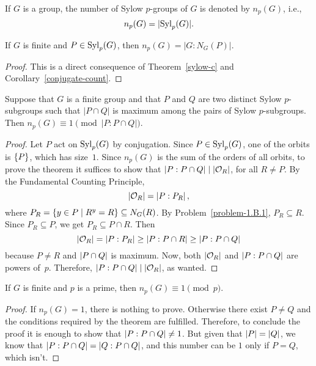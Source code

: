 \begin{ntn}
    If\/ $G$ is a group, the number of Sylow $p$-groups of\/ $G$ is denoted by $n_p(G)$, i.e.,
    $$
        n_p(G) = |{\rm Syl}_p(G)|.
    $$
\end{ntn}

\begin{cor}\label{n_p-is-index}
    If\/ $G$ is finite and $P\in{\rm Syl}_p(G)$, then $n_p(G) = |G:N_G(P)|$.
\end{cor}

\begin{proof} This is a direct consequence of Theorem~\ref{sylow-c} and Corollary~\ref{conjugate-count}.  \end{proof}

\begin{thm}\label{n_p(G)=1}
    Suppose that\/ $G$ is a finite group and that $P$ and\/ $Q$ are two distinct Sylow $p$-subgroups such that $|P \cap Q|$ is maximum among the pairs of Sylow $p$-subgroups. Then $n_p(G) \equiv 1 \pmod{|P:P \cap Q|}$.
\end{thm}

\begin{proof} Let $P$ act on ${\rm Syl}_p(G)$ by conjugation. Since $P\in{\rm Syl}_p(G)$, one of the orbits is $\{P\}$, which has size~$1$. Since $n_p(G)$ is the sum of the orders of all orbits, to prove the theorem it suffices to show that $\left\vert{P:P\cap Q}\right\vert\mid\left\vert{{\cal O}_R}\right\vert$, for all $R\ne P$. By the Fundamental Counting Principle,
$$
    |{\cal O}_R|=\left\vert{P:P_R}\right\vert,
$$
where $P_R=\{y\in P\mid R^y=R\}\subseteq N_G(R)$. By Problem~\ref{problem-1.B.1}, $P_R\subseteq R$. Since $P_R\subseteq P$, we get $P_R\subseteq P\cap R$. Then
$$
    |{\cal O}_R| = \left\vert{P:P_R}\right\vert \ge \left\vert{P:P\cap R}\right\vert \ge \left\vert{P:P\cap Q}\right\vert
$$
because $P\ne R$ and $\left\vert{P\cap Q}\right\vert$ is maximum. Now, both $|{\cal O}_R|$ and $\left\vert{P:P\cap Q}\right\vert$ are powers of\/~$p$. Therefore, $\left\vert{P:P\cap Q}\right\vert\mid|{\cal O}_R|$, as wanted.  \end{proof}

\begin{cor}\label{p|n_p-1}
    If\/ $G$ is finite and $p$ is a prime, then $n_p(G) \equiv 1 \pmod{p}$.
\end{cor}

\begin{proof} If $n_p(G)=1$, there is nothing to prove. Otherwise there exist $P\ne Q$ and the conditions required by the theorem are fulfilled. Therefore, to conclude the proof it is enough to show that $\left\vert{P:P\cap Q}\right\vert\ne1$. But given that $\left\vert{P}\right\vert=\left\vert{Q}\right\vert$, we know that $\left\vert{P:P\cap Q}\right\vert=\left\vert{Q:P\cap Q}\right\vert$, and this number can be $1$ only if $P=Q$, which isn't.   \end{proof}

